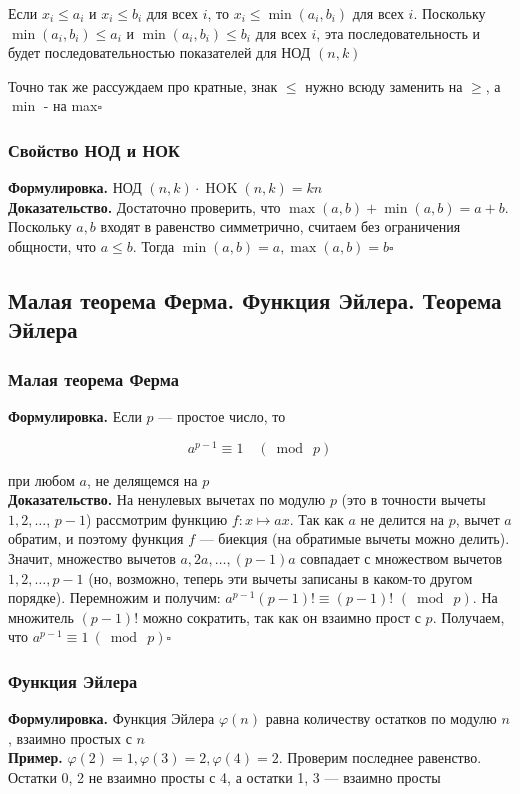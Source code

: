 \documentclass[a4paper]{article}
\newcommand{\qed}{\hfill$\square$}
\begin{document}
Если $x_{i} \leqslant a_{i}$ и $x_{i} \leqslant b_{i}$ для всех $i$, то $x_{i} \leqslant \min \left(a_{i}, b_{i}\right)$ для всех $i$. Поскольку $\min \left(a_{i}, b_{i}\right) \leqslant a_{i}$ и $\min \left(a_{i}, b_{i}\right) \leqslant b_{i}$ для всех $i$, эта последовательность и будет последовательностью показателей для НОД $(n, k)$

Точно так же рассуждаем про кратные, знак $\leqslant$ нужно всюду заменить на $\geqslant$, а $\min$ - на max\qed


\subsubsection*{Свойство НОД и НОК}
\textbf{Формулировка.} НОД $(n, k) \cdot \operatorname{HOK}(n, k)=k n$\\[2mm]
\indent\textbf{Доказательство.} Достаточно проверить, что $\max (a, b)+\min (a, b)=a+b$. Поскольку $a, b$ входят в равенство симметрично, считаем без ограничения общности, что $a \leqslant b$. Тогда $\min (a, b)=a, \max (a, b)=b$\qed



\subsection{Малая теорема Ферма. Функция Эйлера. Теорема Эйлера}
\subsubsection*{Малая теорема Ферма}
\textbf{Формулировка.} Если $p$ — простое число, то

$$
a^{p-1} \equiv 1 \quad(\bmod\ p)
$$

при любом $a$, не делящемся на $p$\\[2mm]
\indent\textbf{Доказательство.} На ненулевых вычетах по модулю $p$ (это в точности вычеты $1,2, \ldots$, $p-1$) рассмотрим функцию $f: x \mapsto a x$. Так как $a$ не делится на $p$, вычет $a$ обратим, и поэтому функция $f$ — биекция (на обратимые вычеты можно делить). Значит, множество вычетов $a, 2 a, \ldots,(p-1) a$ совпадает с множеством вычетов $1,2, \ldots, p-1$ (но, возможно, теперь эти вычеты записаны в каком-то другом порядке). Перемножим и получим: $a^{p-1}(p-1)! \equiv(p-1)$! $(\bmod\ p)$. На множитель $(p-1)$! можно сократить, так как он взаимно прост с $p$. Получаем, что $a^{p-1} \equiv 1\ (\bmod\ p)$\qed


\subsubsection*{Функция Эйлера}
\textbf{Формулировка.} Функция Эйлера $\varphi(n)$ равна количеству остатков по модулю $n$, взаимно простых с $n$\\[2mm]
\indent\textbf{Пример.} $\varphi(2) = 1, \varphi(3) = 2, \varphi(4) = 2.$ Проверим последнее равенство. Остатки 0, 2 не взаимно просты с 4, а остатки 1, 3 — взаимно просты
\end{document}
